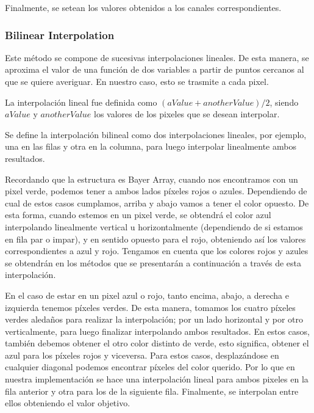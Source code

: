 \vspace{\baselineskip}

Finalmente, se setean los valores obtenidos a los canales correspondientes.



\subsubsection{Bilinear Interpolation}
Este método se compone de sucesivas interpolaciones lineales. De esta manera, se aproxima el valor de una función de dos variables a partir de puntos cercanos al que se quiere averiguar. En nuestro caso, esto se trasmite a cada pixel.  

\vspace{\baselineskip}

La interpolación lineal fue definida como \textit{$(aValue + anotherValue)/2$}, siendo $aValue$ y $anotherValue$ los valores de los pixeles que se desean interpolar. 

\vspace{\baselineskip}

Se define la interpolación bilineal como dos interpolaciones lineales, por ejemplo, una en las filas y otra en la columna, para luego interpolar linealmente ambos resultados. 

\vspace{\baselineskip}

Recordando que la estructura es Bayer Array, cuando nos encontramos con un pixel verde, podemos tener a ambos lados píxeles rojos o azules. Dependiendo de cual de estos casos cumplamos, arriba y abajo vamos a tener el color opuesto. De esta forma, cuando estemos en un pixel verde, se obtendrá el color azul interpolando linealmente vertical u horizontalmente (dependiendo de si estamos en fila par o impar), y en sentido opuesto para el rojo, obteniendo así los valores correspondientes a azul y rojo. Tengamos en cuenta que los colores rojos y azules se obtendrán en los métodos que se presentarán a continuación a través de esta interpolación.

\vspace{\baselineskip}

En el caso de estar en un pixel azul o rojo, tanto encima, abajo, a derecha e izquierda tenemos píxeles verdes. De esta manera, tomamos los cuatro píxeles verdes aledaños para realizar la interpolación; por un lado horizontal y por otro verticalmente, para luego finalizar interpolando ambos resultados. En estos casos, también debemos obtener el otro color distinto de verde, esto significa, obtener el azul para los píxeles rojos y viceversa. Para estos casos, desplazándose en cualquier diagonal podemos encontrar píxeles del color querido. Por lo que en nuestra implementación se hace una interpolación lineal para ambos pixeles en la fila anterior y otra para los de la siguiente fila. Finalmente, se interpolan entre ellos obteniendo el valor objetivo.

